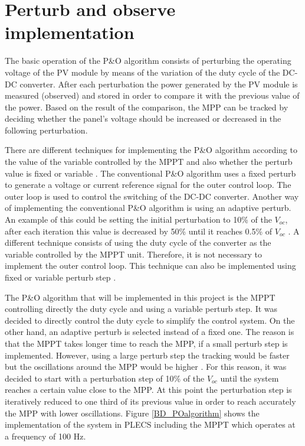 \section{Perturb and observe implementation}\label{MPPTImplementation}

The basic operation of the P\&O algorithm consists of perturbing the operating voltage of the PV module by means of the variation of the duty cycle of the DC-DC converter. After each perturbation the power generated by the PV module is measured (observed) and stored in order to compare it with the previous value of the power. Based on the result of the comparison, the MPP can be tracked by deciding whether the panel's voltage should be increased or decreased in the following perturbation.

There are different techniques for implementing the P\&O algorithm according to the value of the variable controlled by the MPPT and also whether the perturb value is fixed or variable \cite{implementationPandO}. The conventional P\&O algorithm uses a fixed perturb to generate a voltage or current reference signal for the outer control loop. The outer loop is used to control the switching of the DC-DC converter. Another way of implementing the conventional P\&O algorithm is using an adaptive perturb. An example of this could be setting the initial perturbation to 10\% of the $V_{oc}$, after each iteration this value is decreased by 50\% until it reaches 0.5\% of $V_{oc}$ \cite{implementationPandO}. A different technique consists of using the duty cycle of the converter as the variable controlled by the MPPT unit. Therefore, it is not necessary to implement the outer control loop. This technique can also be implemented using fixed or variable perturb step \cite{implementationPandO}. 

The P\&O algorithm that will be implemented in this project is the MPPT controlling directly the duty cycle and using a variable perturb step. It was decided to directly control the duty cycle to simplify the control system. On the other hand, an adaptive perturb is selected instead of a fixed one. The reason is that the MPPT takes longer time to reach the MPP, if a small perturb step is implemented. However, using a large perturb step the tracking would be faster but the oscillations around the MPP would be higher \cite{implementationPandO}. For this reason, it was decided to start with a perturbation step of 10\% of the $V_{oc}$ until the system reaches a certain value close to the MPP. At this point the perturbation step is iteratively reduced to one third of its previous value in order to reach accurately the MPP with lower oscillations. Figure \ref{BD_POalgorithm} shows the implementation of the system in PLECS including the MPPT which operates at a frequency of 100 Hz. 

